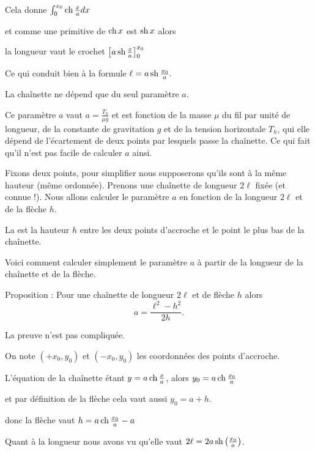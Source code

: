  \change
 Cela donne $\int_0^{x_0} \mathop{\mathrm{ch}}\nolimits \tfrac x a dx$
 
 \change
 et comme une primitive de $\mathop{\mathrm{ch}}\nolimits x$ est $\mathop{\mathrm{sh}}\nolimits x$ alors
 
 la longueur vaut
 le crochet $\left[ a \mathop{\mathrm{sh}}\nolimits \tfrac x a \right]_0^{x_0}$
 
 \change
 Ce qui conduit bien à la formule
 $\ell =  a \mathop{\mathrm{sh}}\nolimits \tfrac{x_0}{a}.$
 
\diapo

 
 \change
La chaînette ne dépend que du seul paramètre $a$.

\change
Ce paramètre $a$ vaut $a = \frac{T_h}{\mu g}$ et est fonction de la masse $\mu$  
du fil par unité de longueur, de la constante de gravitation $g$ et 
de la tension horizontale $T_h$, qui elle dépend de l'écartement
de deux points par lesquels passe la chaînette.
Ce qui fait qu'il n'est pas facile de calculer $a$ ainsi.

\change
Fixons deux points, pour simplifier nous supposerons qu'ils sont à la même 
hauteur (même ordonnée). Prenons une chaînette de longueur $2\ell$ fixée (et connue !).
Nous allons calculer le paramètre $a$ en fonction de la longueur $2\ell$
et de la flèche $h$. 

\change
La  est la hauteur $h$ entre les deux points d'accroche
et le point le plus bas de la chaînette.


\diapo

Voici comment calculer simplement le paramètre $a$ à partir de la longueur
de la chaînette et de la flèche.

Proposition :
Pour une chaînette de longueur $2\ell$ et de flèche $h$ alors
$$a=\frac{\ell^2-h^2}{2h}.$$


\change
La preuve n'est pas compliquée.

On note $(+x_0, y_0)$ et $(-x_0, y_0)$ 
les coordonnées des points d'accroche.

\change
L'équation de la chaînette étant $y= a \mathop{\mathrm{ch}}\nolimits \frac x a$,
alors $y_0 = a \mathop{\mathrm{ch}}\nolimits \frac{x_0}{a}$ 

et par définition de la flèche cela vaut aussi $y_0 = a + h$.

\change
donc la flèche vaut $h = a \mathop{\mathrm{ch}}\nolimits \frac{x_0}{a} -a$

\change
Quant à la longueur nous avons vu qu'elle vaut $2\ell =  2a \mathop{\mathrm{sh}}\nolimits \left( \frac{x_0}{a} \right)$.

\change

